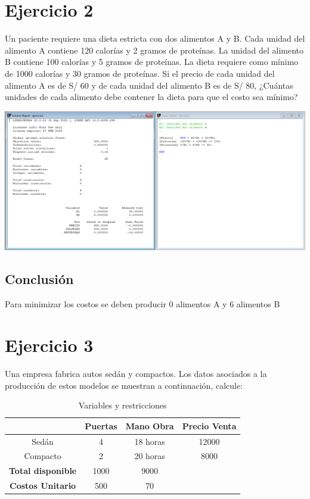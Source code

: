 \documentclass[12pt]{article}
\begin{document}
\newpage
\section*{Ejercicio 2}
\noindent Un paciente requiere una dieta estricta con dos alimentos A y B. Cada unidad del alimento A contiene 120 calorías y 2 gramos de proteínas. La unidad del alimento B contiene 100 calorías y 5 gramos de proteínas. La dieta requiere como mínimo de 1000 calorías y 30 gramos de proteínas. Si el precio de cada unidad del alimento A es de S/ 60 y de cada unidad del alimento B es de S/ 80, ¿Cuántas unidades de cada alimento debe contener la dieta para que el costo sea mínimo? \\
\begin{center}
  \includegraphics[width=1\textwidth]{./assets/ejercicio2.PNG}
\end{center}
\subsection*{Conclusión}
Para minimizar los costos se deben producir 0 alimentos A y 6 alimentos B



\newpage
\section*{Ejercicio 3}
\noindent Una empresa fabrica autos sedán y compactos. Los datos asociados a la producción de estos modelos se muestran a continuación, calcule:
\begin{table}[h]
  \centering
  \begin{tabular}{|c|c|c|c|}
  \hline
                            & \textbf{Puertas}  & \textbf{Mano Obra}  & \textbf{Precio Venta} \\ \hline
  Sedán                     & 4                 & 18 horas            & 12000                 \\ \hline
  Compacto                  & 2                 & 20 horas            & 8000                  \\ \hline
  \textbf{Total disponible} & 1000              & 9000                &                       \\ \hline
  \textbf{Costos Unitario}  & 500               & 70                  &                       \\ \hline
  \end{tabular}
  \caption{Variables y restricciones}
  \label{tab:Ejercicio3}
\end{table}
\end{document}
